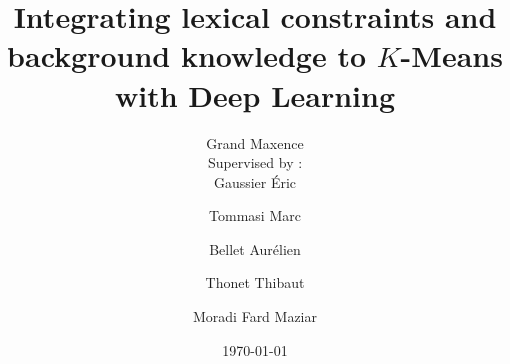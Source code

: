 \title{Integrating lexical constraints and background knowledge to $K$-Means with Deep Learning}
\author{Grand Maxence\\                                                   
        Supervised by : \\Gaussier \'Eric \and Tommasi Marc \and Bellet Aur\'elien  \and Thonet Thibaut \and Moradi Fard Maziar } 
\date{\today}
